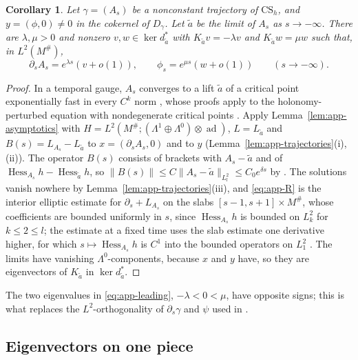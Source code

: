 \documentclass[11pt]{amsart}
\newtheorem{corollary}[theorem]{Corollary}
\theoremstyle{definition}
\theoremstyle{remark}
\theoremstyle{plain}
\numberwithin{equation}{section}
\newcommand{\ad}{\operatorname{ad}}
\begin{document}
\begin{corollary}\label{cor:app-leading}
Let $\gamma=(A_s)$ be a nonconstant trajectory of $\mathrm{CS}_h$, and $y=(\phi,0)\ne0$ in the
cokernel of $D_\gamma$. Let $\tilde a$ be the limit of $A_s$ as $s\to-\infty$. There are
$\lambda,\mu>0$ and nonzero $v,w\in\ker d^*_{\tilde a}$ with $K_{\tilde a}v=-\lambda v$ and
$K_{\tilde a}w=\mu w$ such that, in $L^2(M^\#)$,
\begin{equation}\label{eq:app-leading}
\partial_sA_s=e^{\lambda s}(v+o(1)),\qquad \phi_s=e^{\mu s}(w+o(1))\qquad(s\to-\infty).
\end{equation}
\end{corollary}

\begin{proof}
In a temporal gauge, $A_s$ converges to a lift $\tilde a$ of a critical point exponentially fast
in every $C^k$ norm \cite[Theorem~4.2 and Proposition~4.3]{Donaldson-book}, whose proofs apply
to the holonomy-perturbed equation with nondegenerate critical points
\cite[Section~5.5]{Donaldson-book}. Apply Lemma~\ref{lem:app-asymptotics} with
$H=L^2(M^\#;(\Lambda^1\oplus\Lambda^0)\otimes\ad)$, $L=L_{\tilde a}$ and
$B(s)=L_{A_s}-L_{\tilde a}$ to $x=(\partial_sA_s,0)$ and to $y$
(Lemma~\ref{lem:app-trajectories}(i),(ii)). The operator $B(s)$ consists of brackets with
$A_s-\tilde a$ and of $\operatorname{Hess}_{A_s}h-\operatorname{Hess}_{\tilde a}h$, so
$\|B(s)\|\le C\|A_s-\tilde a\|_{L^2_l}\le C_0e^{\delta s}$ by \cite[Proposition~6.1(iii)]{DFL}.
The solutions vanish nowhere by Lemma~\ref{lem:app-trajectories}(iii), and \eqref{eq:app-R} is
the interior elliptic estimate for $\partial_s+L_{A_s}$ on the slabs $[s-1,s+1]\times M^\#$, whose
coefficients are bounded uniformly in $s$, since $\operatorname{Hess}_{A_s}h$ is bounded on $L^2_k$
for $k\le2\le l$; the estimate at a fixed time uses the slab estimate one derivative higher,
for which $s\mapsto\operatorname{Hess}_{A_s}h$ is $C^1$ into the bounded operators on $L^2_1$
\cite[Proposition~6.1(iii)]{DFL}. The limits have vanishing $\Lambda^0$-components, because $x$ and $y$ have, so
they are eigenvectors of $K_{\tilde a}$ in $\ker d^*_{\tilde a}$.
\end{proof}

The two eigenvalues in \eqref{eq:app-leading}, $-\lambda<0<\mu$, have opposite signs; this is
what replaces the $L^2$-orthogonality of $\partial_s\gamma$ and $\psi$ used in
\cite[p.~79]{DFL}.

\subsection{Eigenvectors on one piece}
\end{document}
